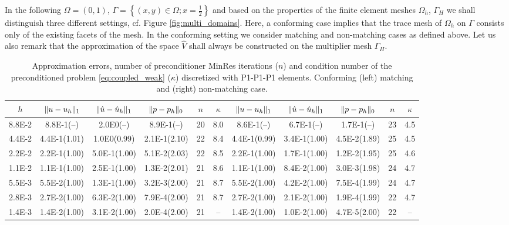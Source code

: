 \documentclass[r]{siamart171218}
\begin{document}
%
In the following $\Omega=(0, 1)$, $\Gamma=\left\{(x, y)\in\Omega; x=\tfrac{1}{2}\right\}$
and based on the properties of the finite element meshes $\Omega_h$, $\Gamma_H$
we shall distinguish three different settings, cf. Figure \ref{fig:multi_domains}.
Here, a conforming case implies that the trace mesh of $\Omega_h$ on $\Gamma$
consists only of the existing facets of the mesh. In the conforming setting 
we consider matching and non-matching cases as defined above. Let us also
remark that the approximation of the space $\hat{V}$ shall always be constructed
on the multiplier mesh $\Gamma_H$.


\begin{table}
  \begin{center}
    \scriptsize{
  \begin{tabular}{c|ccc|c|c||ccc|c|c}
    \hline
    $h$ & $\lVert{u-u_h}\rVert_1$ & $\lVert{\hat{u}-\hat{u}_h}\rVert_1$ & $\lVert{p-p_h}\rVert_0$ & $n$ & $\kappa$
        & $\lVert{u-u_h}\rVert_1$ & $\lVert{\hat{u}-\hat{u}_h}\rVert_1$ & $\lVert{p-p_h}\rVert_0$ & $n$ & $\kappa$ \\
    \hline
8.8E-2 & 8.8E-1(--)   & 2.0E0(--)    & 8.9E-1(--)   & 20 & 8.0 & 8.6E-1(--)   & 6.7E-1(--)   & 1.7E-1(--)   & 23 & 4.5  \\
4.4E-2 & 4.4E-1(1.01) & 1.0E0(0.99)  & 2.1E-1(2.10) & 22 & 8.4 & 4.4E-1(0.99) & 3.4E-1(1.00) & 4.5E-2(1.89) & 25 & 4.5  \\
2.2E-2 & 2.2E-1(1.00) & 5.0E-1(1.00) & 5.1E-2(2.03) & 22 & 8.5 & 2.2E-1(1.00) & 1.7E-1(1.00) & 1.2E-2(1.95) & 25 & 4.6  \\
1.1E-2 & 1.1E-1(1.00) & 2.5E-1(1.00) & 1.3E-2(2.01) & 21 & 8.6 & 1.1E-1(1.00) & 8.4E-2(1.00) & 3.0E-3(1.98) & 24 & 4.7  \\
5.5E-3 & 5.5E-2(1.00) & 1.3E-1(1.00) & 3.2E-3(2.00) & 21 & 8.7 & 5.5E-2(1.00) & 4.2E-2(1.00) & 7.5E-4(1.99) & 24 & 4.7  \\
2.8E-3 & 2.7E-2(1.00) & 6.3E-2(1.00) & 7.9E-4(2.00) & 21 & 8.7 & 2.7E-2(1.00) & 2.1E-2(1.00) & 1.9E-4(1.99) & 22 & 4.7  \\
1.4E-3 & 1.4E-2(1.00) & 3.1E-2(1.00) & 2.0E-4(2.00) & 21 & --  & 1.4E-2(1.00) & 1.0E-2(1.00) & 4.7E-5(2.00) & 22 & --   \\
    \hline
  \end{tabular}
    }
    \caption{Approximation errors, number of preconditioner MinRes iterations ($n$) and
      condition number of the preconditioned problem \eqref{eq:coupled_weak} ($\kappa$) discretized
      with P1-P1-P1 elements. Conforming (left) matching and (right) non-matching case.}
  \label{tab:coupled_p1_p1}
  \end{center}
\end{table}
\end{document}
